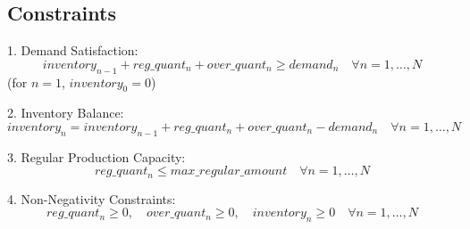 \documentclass{article}
\begin{document}
\subsection*{Constraints}
1. Demand Satisfaction:
   \[
   inventory_{n-1} + reg\_quant_n + over\_quant_n \geq demand_n \quad \forall n = 1, \ldots, N
   \]
   (for \( n = 1 \), \( inventory_0 = 0 \))

2. Inventory Balance:
   \[
   inventory_n = inventory_{n-1} + reg\_quant_n + over\_quant_n - demand_n \quad \forall n = 1, \ldots, N
   \]

3. Regular Production Capacity:
   \[
   reg\_quant_n \leq max\_regular\_amount \quad \forall n = 1, \ldots, N
   \]

4. Non-Negativity Constraints:
   \[
   reg\_quant_n \geq 0, \quad over\_quant_n \geq 0, \quad inventory_n \geq 0 \quad \forall n = 1, \ldots, N
   \]
\end{document}
